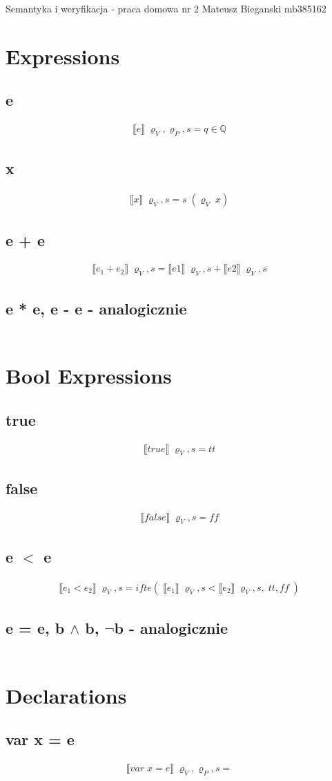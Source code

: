 \documentclass[12pt]{article}
\newcommand{\sem}[1]{\llbracket #1 \rrbracket}
\newcommand{\srod}{\;\varrho_{V}, s}
\newcommand{\srodP}{\;\varrho_{V}, \varrho_{P}, s}
\newcommand{\eq}[2]{\subsection{#1} \begin{gather*} #2 \end{gather*}}
\begin{document}
\begin{center}
	\Large{Semantyka i weryfikacja - praca domowa nr 2}
	\newline
	\large{Mateusz Bieganski mb385162}
\end{center}


\section{Expressions}
\eq{e}{	
	\sem{e} \srodP = q \in \mathbb{Q}
}

\eq {x} {
	\sem{x} \srod = s \;(\varrho_{V} \; x)
}

\eq {e + e} {
	\sem{e_1 + e_2} \srod = \sem{e1} \srod + \sem{e2} \srod
}

\eq {e * e, e - e - analogicznie} {
\;
}

\section{Bool Expressions}
\eq {true} {
	\sem{true} \srod = tt
}

\eq {false} {
	\sem{false} \srod = ff
}

\eq {e $<$ e} {
	\sem{e_1 < e_2} \srod = ifte(\;\sem{e_1} \srod < \sem{e_2} \srod, \; tt, ff \;)
}

\eq {e = e, b $\wedge$ b, $\neg$b - analogicznie} {
	\;
}

\section{Declarations}
\eq {var x = e} {
	\sem{var \; x = e} \srodP = 
}
\end{document}
